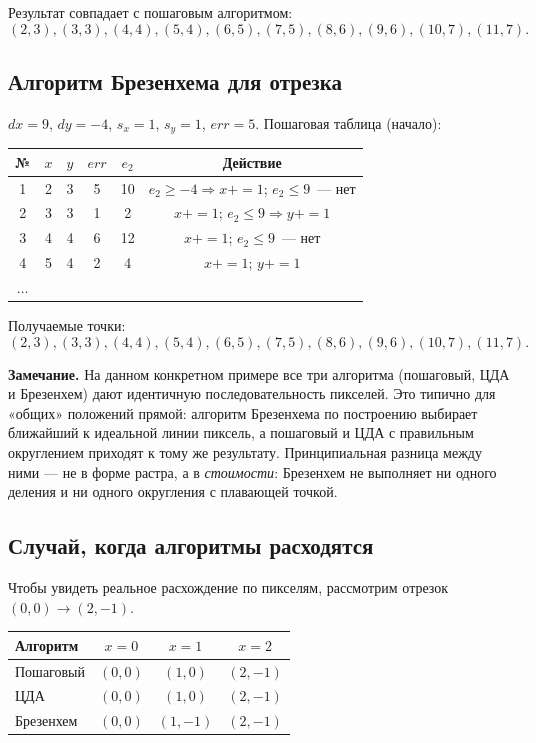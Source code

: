 \documentclass[a4paper,14pt]{extarticle}
\begin{document}
Результат совпадает с пошаговым алгоритмом:
\[
(2,3), (3,3), (4,4), (5,4), (6,5), (7,5), (8,6), (9,6), (10,7), (11,7).
\]

\subsection{Алгоритм Брезенхема для отрезка}
$dx = 9$, $dy = -4$, $s_x = 1$, $s_y = 1$, $err = 5$.
Пошаговая таблица (начало):
\begin{center}
\begin{tabular}{cccccc}
\toprule
№ & $x$ & $y$ & $err$ & $e_2$ & Действие \\
\midrule
1 & 2 & 3 & 5  & 10 & $e_2 \ge -4 \Rightarrow x{+}{=}1$; $e_2 \le 9$~--- нет \\
2 & 3 & 3 & 1  & 2  & $x{+}{=}1$; $e_2 \le 9 \Rightarrow y{+}{=}1$ \\
3 & 4 & 4 & 6  & 12 & $x{+}{=}1$; $e_2 \le 9$~--- нет \\
4 & 5 & 4 & 2  & 4  & $x{+}{=}1$; $y{+}{=}1$ \\
$\dots$ & & & & & \\
\bottomrule
\end{tabular}
\end{center}

Получаемые точки:
\[
(2,3), (3,3), (4,4), (5,4), (6,5), (7,5), (8,6), (9,6), (10,7), (11,7).
\]

\textbf{Замечание.} На данном конкретном примере все три алгоритма (пошаговый, ЦДА и Брезенхем) дают идентичную последовательность пикселей. Это типично для «общих» положений прямой: алгоритм Брезенхема по построению выбирает ближайший к идеальной линии пиксель, а пошаговый и ЦДА с правильным округлением приходят к тому же результату. Принципиальная разница между ними — не в форме растра, а в \emph{стоимости}: Брезенхем не выполняет ни одного деления и ни одного округления с плавающей точкой.

\subsection{Случай, когда алгоритмы расходятся}
Чтобы увидеть реальное расхождение по пикселям, рассмотрим отрезок $(0,0) \to (2,-1)$.

\begin{center}
\begin{tabular}{lccc}
\toprule
Алгоритм & $x=0$ & $x=1$ & $x=2$ \\
\midrule
Пошаговый & $(0,0)$ & $(1,0)$  & $(2,-1)$ \\
ЦДА       & $(0,0)$ & $(1,0)$  & $(2,-1)$ \\
Брезенхем & $(0,0)$ & $(1,-1)$ & $(2,-1)$ \\
\bottomrule
\end{tabular}
\end{center}
\end{document}
